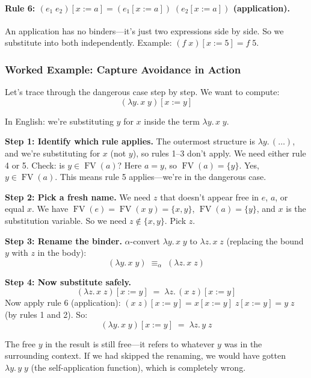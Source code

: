 \documentclass[11pt,a4paper]{article}
\theoremstyle{definition}
\newcommand{\lam}{\lambda}
\newcommand{\aeq}{\equiv_\alpha}
\newcommand{\FV}{\operatorname{FV}}
\begin{document}
\paragraph{Rule 6: $(e_1\;e_2)[x := a] = (e_1[x := a])\;(e_2[x := a])$ (application).}
An application has no binders---it's just two expressions side by side. So we
substitute into both independently. Example:
$(f\;x)[x := 5] = f\;5$.

\subsubsection{Worked Example: Capture Avoidance in Action}

Let's trace through the dangerous case step by step. We want to compute:
\[
  (\lam y.\, x\;y)[x := y]
\]

In English: we're substituting $y$ for $x$ inside the term $\lam y.\, x\;y$.

\textbf{Step 1: Identify which rule applies.}
The outermost structure is $\lam y.\, (\ldots)$, and we're substituting for $x$
(not $y$), so rules 1--3 don't apply. We need either rule 4 or 5. Check: is
$y \in \FV(a)$? Here $a = y$, so $\FV(a) = \{y\}$. Yes, $y \in \FV(a)$. This
means rule 5 applies---we're in the dangerous case.

\textbf{Step 2: Pick a fresh name.}
We need $z$ that doesn't appear free in $e$, $a$, or equal $x$. We have
$\FV(e) = \FV(x\;y) = \{x, y\}$, $\FV(a) = \{y\}$, and $x$ is the substitution
variable. So we need $z \notin \{x, y\}$. Pick $z$.

\textbf{Step 3: Rename the binder.}
$\alpha$-convert $\lam y.\, x\;y$ to $\lam z.\, x\;z$ (replacing the bound $y$
with $z$ in the body):
\[
  (\lam y.\, x\;y) \;\aeq\; (\lam z.\, x\;z)
\]

\textbf{Step 4: Now substitute safely.}
\[
  (\lam z.\, x\;z)[x := y] \;=\; \lam z.\, (x\;z)[x := y]
\]
Now apply rule 6 (application): $(x\;z)[x := y] = x[x := y]\;z[x := y] =
y\;z$ (by rules 1 and 2). So:
\[
  (\lam y.\, x\;y)[x := y] \;=\; \lam z.\, y\;z
\]

The free $y$ in the result is still free---it refers to whatever $y$ was in the
surrounding context. If we had skipped the renaming, we would have gotten
$\lam y.\, y\;y$ (the self-application function), which is completely wrong.
\end{document}

